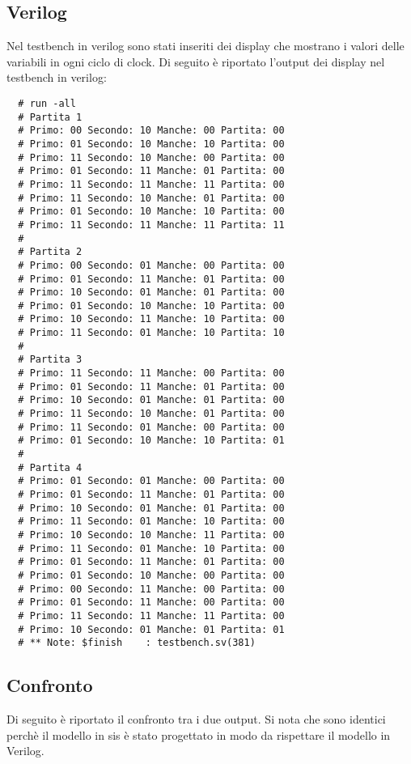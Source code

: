 \documentclass[a4paper]{article}
\begin{document}
\subsection{Verilog}
Nel testbench in verilog sono stati inseriti dei display che mostrano i valori delle variabili in ogni ciclo di clock.
Di seguito è riportato l'output dei display nel testbench in verilog:
\begin{lstlisting}
  # run -all
  # Partita 1
  # Primo: 00 Secondo: 10 Manche: 00 Partita: 00
  # Primo: 01 Secondo: 10 Manche: 10 Partita: 00
  # Primo: 11 Secondo: 10 Manche: 00 Partita: 00
  # Primo: 01 Secondo: 11 Manche: 01 Partita: 00
  # Primo: 11 Secondo: 11 Manche: 11 Partita: 00
  # Primo: 11 Secondo: 10 Manche: 01 Partita: 00
  # Primo: 01 Secondo: 10 Manche: 10 Partita: 00
  # Primo: 11 Secondo: 11 Manche: 11 Partita: 11
  # 
  # Partita 2
  # Primo: 00 Secondo: 01 Manche: 00 Partita: 00
  # Primo: 01 Secondo: 11 Manche: 01 Partita: 00
  # Primo: 10 Secondo: 01 Manche: 01 Partita: 00
  # Primo: 01 Secondo: 10 Manche: 10 Partita: 00
  # Primo: 10 Secondo: 11 Manche: 10 Partita: 00
  # Primo: 11 Secondo: 01 Manche: 10 Partita: 10
  # 
  # Partita 3
  # Primo: 11 Secondo: 11 Manche: 00 Partita: 00
  # Primo: 01 Secondo: 11 Manche: 01 Partita: 00
  # Primo: 10 Secondo: 01 Manche: 01 Partita: 00
  # Primo: 11 Secondo: 10 Manche: 01 Partita: 00
  # Primo: 11 Secondo: 01 Manche: 00 Partita: 00
  # Primo: 01 Secondo: 10 Manche: 10 Partita: 01
  # 
  # Partita 4
  # Primo: 01 Secondo: 01 Manche: 00 Partita: 00
  # Primo: 01 Secondo: 11 Manche: 01 Partita: 00
  # Primo: 10 Secondo: 01 Manche: 01 Partita: 00
  # Primo: 11 Secondo: 01 Manche: 10 Partita: 00
  # Primo: 10 Secondo: 10 Manche: 11 Partita: 00
  # Primo: 11 Secondo: 01 Manche: 10 Partita: 00
  # Primo: 01 Secondo: 11 Manche: 01 Partita: 00
  # Primo: 01 Secondo: 10 Manche: 00 Partita: 00
  # Primo: 00 Secondo: 11 Manche: 00 Partita: 00
  # Primo: 01 Secondo: 11 Manche: 00 Partita: 00
  # Primo: 11 Secondo: 11 Manche: 11 Partita: 00
  # Primo: 10 Secondo: 01 Manche: 01 Partita: 01
  # ** Note: $finish    : testbench.sv(381)
\end{lstlisting}

\subsection{Confronto}
Di seguito è riportato il confronto tra i due output. Si nota che sono identici perchè il modello in sis 
è stato progettato in modo da rispettare il modello in Verilog.
\end{document}
